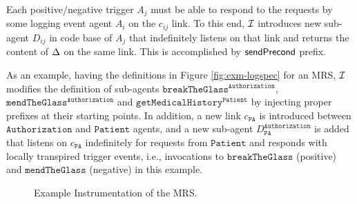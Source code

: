 Each positive/negative trigger $A_j$ must be able to respond to the requests by some logging event agent $A_i$ on the $c_{ij}$ link. To this end, $\mathcal{I}$ introduces new sub-agent $D_{ij}$ in code base of $A_j$ that indefinitely listens on that link and returns the content of $\Delta$ on the same link. This is accomplished by $\mathsf{sendPrecond}$ prefix.

As an example, having the definitions in Figure \ref{fig:exm-logspec} for an MRS, $\mathcal{I}$ modifies the definition of sub-agents  $\mathtt{breakTheGlass}^{\mathtt{Authorization}}$, $\mathtt{mendTheGlass}^{\mathtt{Authorization}}$ and $\mathtt{getMedicalHistory}^{\mathtt{Patient}}$ by injecting proper prefixes at their starting points. In addition, a new link $c_{\mathtt{PA}}$ is introduced between $\mathtt{Authorization}$ and $\mathtt{Patient}$ agents, and a new sub-agent  $D_{\mathtt{PA}}^{\mathtt{Authorization}}$ is added that listens on $c_{\mathtt{PA}}$ indefinitely for requests from  $\mathtt{Patient}$ and responds with locally transpired trigger events, i.e., invocations to $\mathtt{breakTheGlass}$ (positive) and $\mathtt{mendTheGlass}$ (negative) in this example.


\begin{figure}
\setlength{\fboxsep}{0pt}%
\caption{Example Instrumentation of the MRS.}
\label{fig:exm-inst}
\end{figure}

